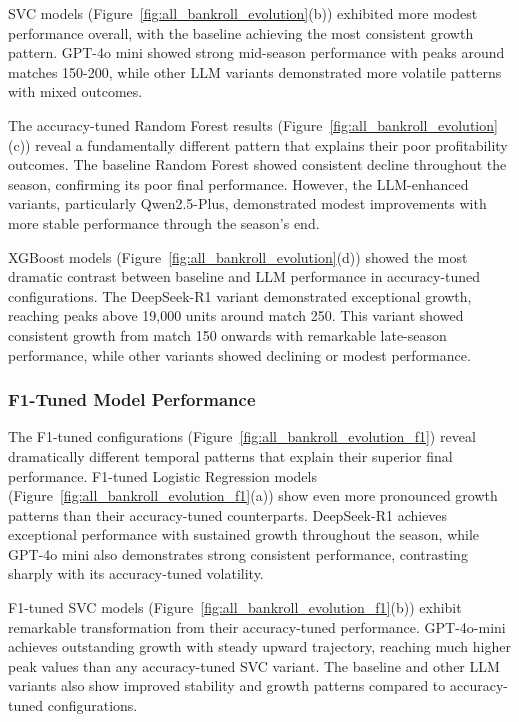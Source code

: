 \documentclass[conference]{IEEEtran}
\begin{document}
SVC models (Figure~\ref{fig:all_bankroll_evolution}(b)) exhibited more modest performance overall, with the baseline achieving the most consistent growth pattern. GPT-4o mini showed strong mid-season performance with peaks around matches 150-200, while other LLM variants demonstrated more volatile patterns with mixed outcomes.

The accuracy-tuned Random Forest results (Figure~\ref{fig:all_bankroll_evolution}(c)) reveal a fundamentally different pattern that explains their poor profitability outcomes. The baseline Random Forest showed consistent decline throughout the season, confirming its poor final performance. However, the LLM-enhanced variants, particularly Qwen2.5-Plus, demonstrated modest improvements with more stable performance through the season's end.

XGBoost models (Figure~\ref{fig:all_bankroll_evolution}(d)) showed the most dramatic contrast between baseline and LLM performance in accuracy-tuned configurations. The DeepSeek-R1 variant demonstrated exceptional growth, reaching peaks above 19,000 units around match 250. This variant showed consistent growth from match 150 onwards with remarkable late-season performance, while other variants showed declining or modest performance.

\subsubsection{F1-Tuned Model Performance}

The F1-tuned configurations (Figure~\ref{fig:all_bankroll_evolution_f1}) reveal dramatically different temporal patterns that explain their superior final performance. F1-tuned Logistic Regression models (Figure~\ref{fig:all_bankroll_evolution_f1}(a)) show even more pronounced growth patterns than their accuracy-tuned counterparts. DeepSeek-R1 achieves exceptional performance with sustained growth throughout the season, while GPT-4o mini also demonstrates strong consistent performance, contrasting sharply with its accuracy-tuned volatility.

F1-tuned SVC models (Figure~\ref{fig:all_bankroll_evolution_f1}(b)) exhibit remarkable transformation from their accuracy-tuned performance. GPT-4o-mini achieves outstanding growth with steady upward trajectory, reaching much higher peak values than any accuracy-tuned SVC variant. The baseline and other LLM variants also show improved stability and growth patterns compared to accuracy-tuned configurations.
\end{document}
